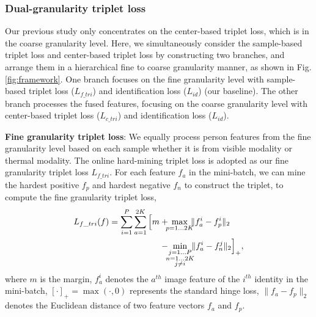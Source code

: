 \documentclass[journal]{IEEEtran}
\begin{document}
\subsubsection{Dual-granularity triplet loss}
Our previous study \cite{Liu2020ParametersSE} only concentrates on the center-based triplet loss, which is in the coarse granularity level. Here, we simultaneously consider the sample-based triplet loss and center-based triplet loss by constructing two branches, and arrange them in a hierarchical fine to coarse granularity manner, as shown in Fig. \ref{fig:framework}. One branch focuses on the fine granularity level with sample-based triplet loss ($L_{f\_tri}$) and identification loss ($L_{id}$) (our baseline). The other branch processes the fused features, focusing on the coarse granularity level with center-based triplet loss ($L_{c\_tri}$) and identification loss ($L_{id}$).

\textbf{Fine granularity triplet loss}: We equally process person features from the fine granularity level based on each sample whether it is from visible modality or thermal modality. The online hard-mining triplet loss \cite{hermans2017defense} is adopted as our fine granularity triplet loss $L_{f\_tri}$. For each feature $f_a$ in the mini-batch, we can mine the hardest positive $f_p$ and hardest negative $f_n$ to construct the triplet, to compute the fine granularity triplet loss,
\begin{align}\label{eq:loss}
    L_{f\_tri}(f) = \sum\limits_{i=1}^{P} \sum\limits_{a=1}^{2K}
        \Big[m & + \hspace*{-5pt} \max\limits_{p=1 \dots 2K} \hspace*{-5pt} \|f^i_a - f^i_p\|_2  \\
               & - \hspace*{-5pt} \min\limits_{\substack{j=1 \dots P \\ n=1 \dots 2K \\ j \neq i}} \hspace*{-5pt} \| f^i_a - f^j_n \| _2 \Big]_+,\nonumber
\end{align}
where $m$ is the margin, $f_a^i$ denotes the $a^{th}$ image feature of the $i^{th}$ identity in the mini-batch, $[\cdot]_{+} = \max(\cdot, 0)$ represents the standard hinge loss, $\| f_a - f_p \|_2$ denotes the Euclidean distance of two feature vectors $f_a$ and $f_p$.
\end{document}
